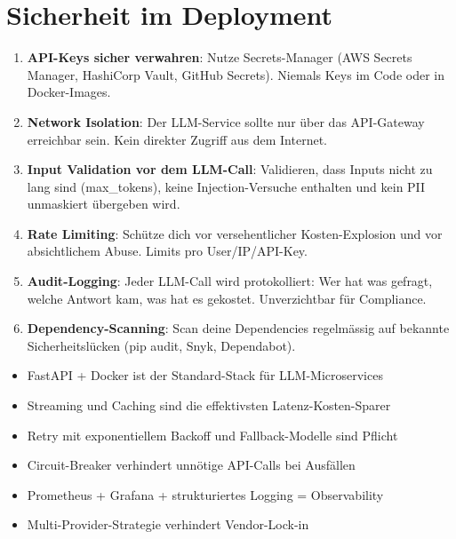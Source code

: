 \section{Sicherheit im Deployment}

\begin{enumerate}[leftmargin=*]
    \item \textbf{API-Keys sicher verwahren}: Nutze Secrets-Manager (AWS Secrets Manager, HashiCorp Vault, GitHub Secrets). Niemals Keys im Code oder in Docker-Images.
    \item \textbf{Network Isolation}: Der LLM-Service sollte nur über das API-Gateway erreichbar sein. Kein direkter Zugriff aus dem Internet.
    \item \textbf{Input Validation vor dem LLM-Call}: Validieren, dass Inputs nicht zu lang sind (max\_tokens), keine Injection-Versuche enthalten und kein PII unmaskiert übergeben wird.
    \item \textbf{Rate Limiting}: Schütze dich vor versehentlicher Kosten-Explosion und vor absichtlichem Abuse. Limits pro User/IP/API-Key.
    \item \textbf{Audit-Logging}: Jeder LLM-Call wird protokolliert: Wer hat was gefragt, welche Antwort kam, was hat es gekostet. Unverzichtbar für Compliance.
    \item \textbf{Dependency-Scanning}: Scan deine Dependencies regelmässig auf bekannte Sicherheitslücken (pip audit, Snyk, Dependabot).
\end{enumerate}

\begin{zusammenfassung}
\begin{itemize}[leftmargin=*]
    \item FastAPI + Docker ist der Standard-Stack für LLM-Microservices
    \item Streaming und Caching sind die effektivsten Latenz-Kosten-Sparer
    \item Retry mit exponentiellem Backoff und Fallback-Modelle sind Pflicht
    \item Circuit-Breaker verhindert unnötige API-Calls bei Ausfällen
    \item Prometheus + Grafana + strukturiertes Logging = Observability
    \item Multi-Provider-Strategie verhindert Vendor-Lock-in
\end{itemize}
\end{zusammenfassung}

